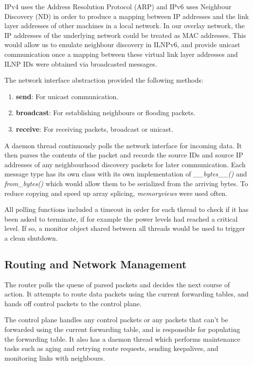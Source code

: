\documentclass[12pt]{article}
\begin{document}
IPv4 uses the Address Resolution Protocol (ARP) and IPv6 uses Neighbour Discovery (ND) in order to produce a mapping between IP addresses and the link layer addresses of other machines in a local network. In our overlay network, the IP addresses of the underlying network could be treated as MAC addresses. This would allow us to emulate neighbour discovery in ILNPv6, and provide unicast communication once a mapping between these virtual link layer addresses and ILNP IDs were obtained via broadcasted messages. 

The network interface abstraction provided the following methods:
\begin{enumerate}
	\item \textbf{send}: For unicast communication.
	\item \textbf{broadcast}: For establishing neighbours or flooding packets.
	\item \textbf{receive}: For receiving packets, broadcast or unicast.
\end{enumerate}

A daemon thread continuously polls the network interface for incoming data. It then parses the contents of the packet and records the source IDs and source IP addresses of any neighbourhood discovery packets for later communication. Each message type has its own class with its own implementation of \emph{\_\_bytes\_\_()} and \emph{from\_bytes()} which would allow them to be serialized from the arriving bytes. To reduce copying and speed up array splicing, \emph{memoryviews} were used often.

All polling functions included a timeout in order for each thread to check if it has been asked to terminate, if for example the power levels had reached a critical level. If so, a monitor object shared between all threads would be used to trigger a clean shutdown.

\subsection{Routing and Network Management}

The router polls the queue of parsed packets and decides the next course of action. It attempts to route data packets using the current forwarding tables, and hands off control packets to the control plane. 

The control plane handles any control packets or any packets that can't be forwarded using the current forwarding table, and is responsible for populating the forwarding table. It also has a daemon thread which performs maintenance tasks such as aging and retrying route requests, sending keepalives, and monitoring links with neighbours.
\end{document}

